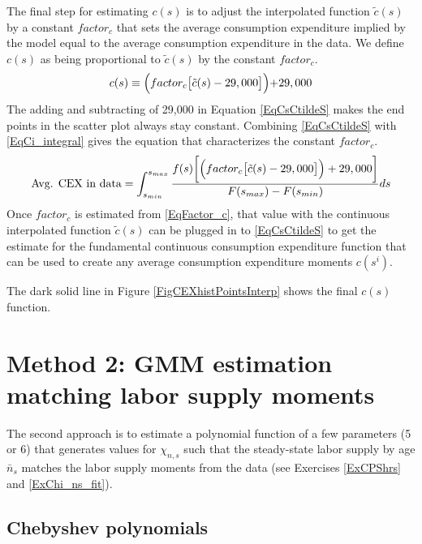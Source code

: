 \documentclass[letterpaper,12pt]{article}
\theoremstyle{definition}
\begin{document}
      The final step for estimating $c(s)$ is to adjust the interpolated function $\tilde{c}(s)$ by a constant $factor_c$ that sets the average consumption expenditure implied by the model equal to the average consumption expenditure in the data. We define $c(s)$ as being proportional to $\tilde{c}(s)$ by the constant $factor_c$.
      \begin{equation}\label{EqCsCtildeS}
        c(s) \equiv \Bigl(factor_c \bigl[\tilde{c}(s) - 29,000\bigr]\Bigl) + 29,000
      \end{equation}
      The adding and subtracting of 29,000 in Equation \eqref{EqCsCtildeS} makes the end points in the scatter plot always stay constant. Combining \eqref{EqCsCtildeS} with \eqref{EqCi_integral} gives the equation that characterizes the constant $factor_c$.
      \begin{equation}\label{EqFactor_c}
        \text{Avg. CEX in data} = \int_{s_{min}}^{s_{max}}\frac{f(s)\biggl[\Bigl(factor_c \bigl[\tilde{c}(s) - 29,000\bigr]\Bigr) + 29,000\biggr]}{F(s_{max}) - F(s_{min})}ds
      \end{equation}
      Once $factor_c$ is estimated from \eqref{EqFactor_c}, that value with the continuous interpolated function $\tilde{c}(s)$ can be plugged in to \eqref{EqCsCtildeS} to get the estimate for the fundamental continuous consumption expenditure function that can be used to create any average consumption expenditure moments $c(s^i)$.

      The dark solid line in Figure \ref{FigCEXhistPointsInterp} shows the final $c(s)$ function.


\section{Method 2: GMM estimation matching labor supply moments}

  The second approach is to estimate a polynomial function of a few parameters (5 or 6) that generates values for $\chi_{n,s}$ such that the steady-state labor supply by age $\bar{n}_s$ matches the labor supply moments from the data (see Exercises \ref{ExCPShrs} and \ref{ExChi_ns_fit}).


  \subsection{Chebyshev polynomials}\label{SecChebyshev}
\end{document}
